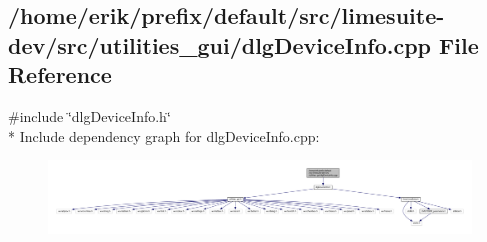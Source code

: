 \subsection{/home/erik/prefix/default/src/limesuite-\/dev/src/utilities\+\_\+gui/dlg\+Device\+Info.cpp File Reference}
\label{dlgDeviceInfo_8cpp}
{\ttfamily \#include \char`\"{}dlg\+Device\+Info.\+h\char`\"{}}\\*
Include dependency graph for dlg\+Device\+Info.\+cpp\+:
\nopagebreak
\begin{figure}[H]
\begin{center}
\leavevmode
\includegraphics[width=350pt]{d1/d8b/dlgDeviceInfo_8cpp__incl}
\end{center}
\end{figure}
